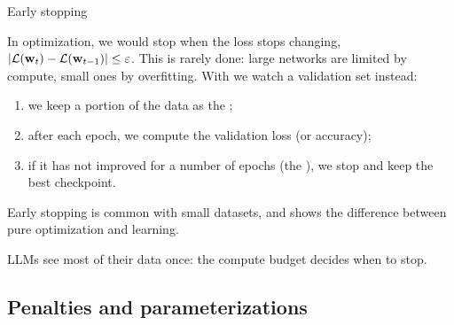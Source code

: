 \documentclass[11pt,aspectratio=169]{beamer}
\begin{document}
\begin{frame}{Early stopping}
    \setlength{\parskip}{5pt}

    In optimization, we would stop when the loss stops changing,
    $\lvert\mathcal{L}(\boldsymbol{\mathbf{w}}_t)-\mathcal{L}(\boldsymbol{\mathbf{w}}_{t-1})\rvert\le\varepsilon$.
    This is rarely done: large networks are limited by compute, small ones by
    overfitting. With  we watch a validation set instead:
    \begin{enumerate}
        \item we keep a portion of the data as the ;
        \item after each epoch, we compute the validation loss (or accuracy);
        \item if it has not improved for a number of epochs (the
              ), we stop and keep the best checkpoint.
    \end{enumerate}

    \begin{tcolorbox}[nndsgreen]
        Early stopping is common with small datasets, and shows the difference
        between pure optimization and learning.
    \end{tcolorbox}

    LLMs see most of their data once: the compute budget decides when to stop.

\end{frame}

\subsection{Penalties and parameterizations}
\end{document}
